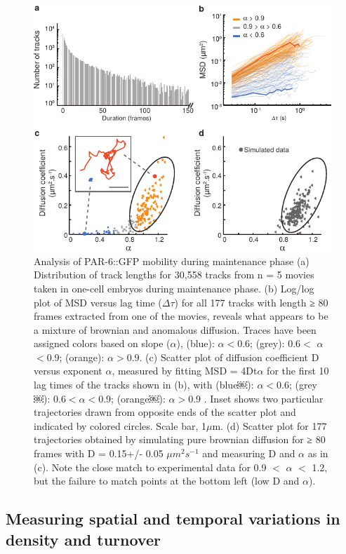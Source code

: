   \begin{figure}[h!]
  	\centering
  	\includegraphics[width=0.8\hsize]{nmeth/Fig3}
  	\caption[Analysis of PAR-6::GFP mobility during maintenance phase]{\label{fig:fig3}Analysis of PAR-6::GFP mobility during maintenance phase (a) Distribution of track lengths for 30,558 tracks from n = 5 movies taken in one-cell embryos during maintenance phase. (b) Log/log plot of MSD versus lag time ($\Delta \tau$) for all 177 tracks with length ≥ 80 frames extracted from one of the movies, reveals what appears to be a mixture of brownian and anomalous diffusion. Traces have been assigned colors based on slope ($\alpha$), (blue): $\alpha$$<$0.6; (grey): 0.6$<$ $\alpha$ $<$0.9; (orange): $\alpha$$>$0.9. (c) Scatter plot of diffusion coefficient D versus exponent $\alpha$, measured by fitting MSD = 4Dt$\alpha$ for the first 10 lag times of the tracks shown in (b), with (blue￼): $\alpha$$<$0.6; (grey￼): 0.6$<$$\alpha$$<$0.9; (orange￼): $\alpha$$>$0.9 . Inset shows two particular trajectories drawn from opposite ends of the scatter plot and indicated by colored circles. Scale bar, 1$\mu$m. (d) Scatter plot for 177 trajectories obtained by simulating pure brownian diffusion for ≥ 80 frames with D = 0.15+/- 0.05 $\mu$$m^2$$s^{-1}$ and measuring D and $\alpha$ as in (c). Note the close match to experimental data for 0.9 $<$ $\alpha$ $<$ 1.2, but the failure to match points at the bottom left (low D and $\alpha$). }
  \end{figure}
 

 
 
 \subsection{Measuring spatial and temporal variations in density and turnover}
 
